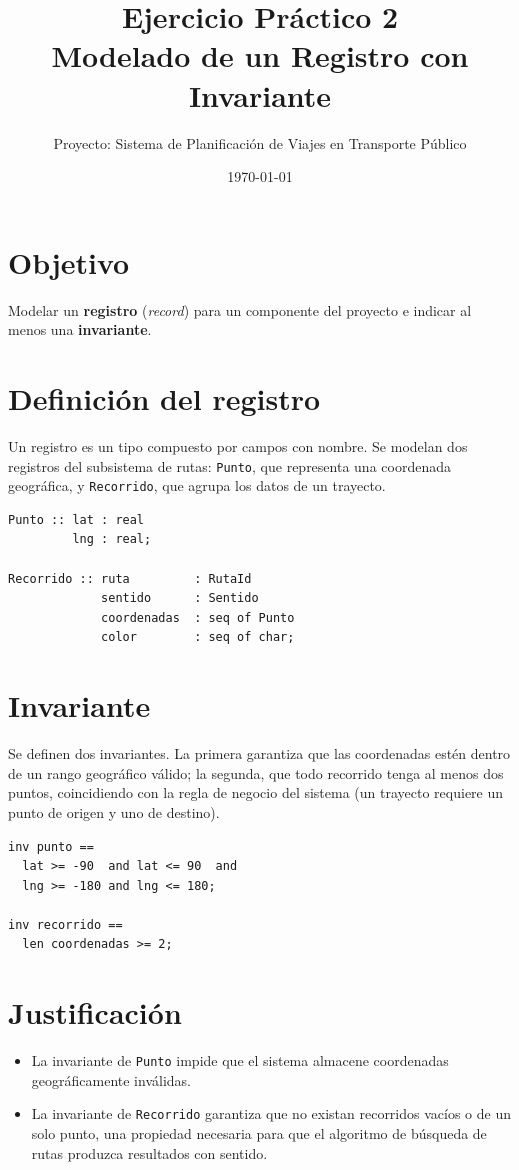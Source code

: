 \documentclass[11pt,a4paper]{article}
\title{\textbf{Ejercicio Práctico 2}\\[2mm]
\large Modelado de un Registro con Invariante}
\author{Proyecto: Sistema de Planificación de Viajes en Transporte Público}
\date{\today}
\begin{document}
\maketitle

\section{Objetivo}

Modelar un \textbf{registro} (\emph{record}) para un componente del proyecto e indicar al menos una \textbf{invariante}.

\section{Definición del registro}

Un registro es un tipo compuesto por campos con nombre. Se modelan dos registros del subsistema de rutas: \texttt{Punto}, que representa una coordenada geográfica, y \texttt{Recorrido}, que agrupa los datos de un trayecto.

\begin{lstlisting}
Punto :: lat : real
         lng : real;

Recorrido :: ruta         : RutaId
             sentido      : Sentido
             coordenadas  : seq of Punto
             color        : seq of char;
\end{lstlisting}

\section{Invariante}

Se definen dos invariantes. La primera garantiza que las coordenadas estén dentro de un rango geográfico válido; la segunda, que todo recorrido tenga al menos dos puntos, coincidiendo con la regla de negocio del sistema (un trayecto requiere un punto de origen y uno de destino).

\begin{lstlisting}
inv punto ==
  lat >= -90  and lat <= 90  and
  lng >= -180 and lng <= 180;

inv recorrido ==
  len coordenadas >= 2;
\end{lstlisting}

\section{Justificación}

\begin{itemize}
  \item La invariante de \texttt{Punto} impide que el sistema almacene coordenadas geográficamente inválidas.
  \item La invariante de \texttt{Recorrido} garantiza que no existan recorridos vacíos o de un solo punto, una propiedad necesaria para que el algoritmo de búsqueda de rutas produzca resultados con sentido.
\end{itemize}
\end{document}
